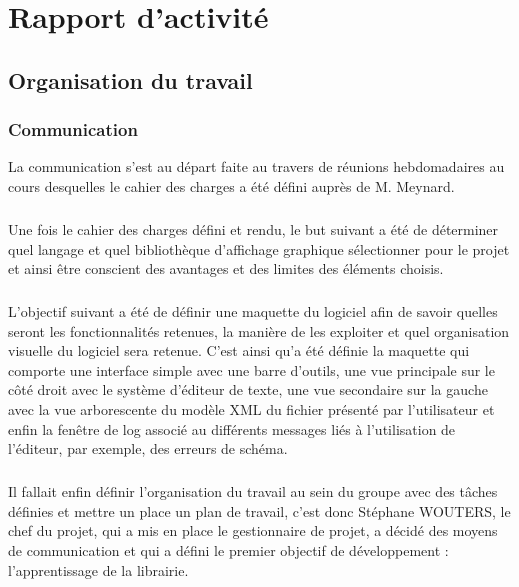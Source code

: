 \chapter{Rapport d'activité}

\section{Organisation du travail}
        
\subsection{Communication}

La communication s'est au départ faite au travers de réunions hebdomadaires au cours desquelles le cahier des charges a été défini auprès de M. Meynard.
\paragraph{}
       
Une fois le cahier des charges défini et rendu, le but suivant a été de déterminer quel langage et quel bibliothèque d'affichage graphique sélectionner pour le projet et ainsi être conscient des avantages et des limites des éléments choisis.
\paragraph{}

L'objectif suivant a été de définir une maquette du logiciel afin de savoir quelles seront les fonctionnalités retenues, la manière de les exploiter et quel organisation visuelle du logiciel sera retenue. C'est ainsi qu'a été définie la maquette qui comporte une interface simple avec une barre d'outils, une vue principale sur le côté droit avec le système d'éditeur de texte, une vue secondaire sur la gauche avec la vue arborescente du modèle XML du fichier présenté par l'utilisateur et enfin la fenêtre de log associé au différents messages liés à l'utilisation de l'éditeur, par exemple, des erreurs de schéma.
\paragraph{}

Il fallait enfin définir l'organisation du travail au sein du groupe avec des tâches définies et mettre un place un plan de travail, c'est donc Stéphane WOUTERS, le chef du projet, qui a mis en place le gestionnaire de projet, a décidé des moyens de communication et qui a défini le premier objectif de développement : l'apprentissage de la librairie.
